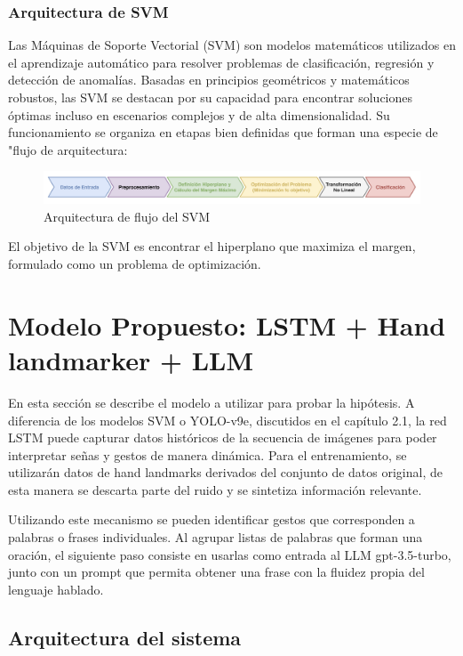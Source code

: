 \documentclass{article}
\begin{document}
\subsubsection{Arquitectura de SVM}

Las Máquinas de Soporte Vectorial (SVM) son modelos matemáticos utilizados en el aprendizaje automático para resolver problemas de clasificación, regresión y detección de anomalías. Basadas en principios geométricos y matemáticos robustos, las SVM se destacan por su capacidad para encontrar soluciones óptimas incluso en escenarios complejos y de alta dimensionalidad.  Su funcionamiento se organiza en etapas bien definidas que forman una especie de "flujo de arquitectura:

\begin{figure}[!hbtp]
    \centering
    \includegraphics[width=5in]{figuras/flujoSVM.png}
		\caption{Arquitectura de flujo del SVM}
		\label{fig6}
\end{figure}

El objetivo de la SVM es encontrar el hiperplano que maximiza el margen, formulado como un problema de optimización.


\section{Modelo Propuesto: LSTM + Hand landmarker + LLM}

En esta sección se describe el modelo a utilizar para probar la hipótesis. A diferencia de los modelos SVM o YOLO-v9e, discutidos en el capítulo 2.1, la red LSTM puede capturar datos históricos de la secuencia de imágenes para poder interpretar señas y gestos de manera dinámica. Para el entrenamiento, se utilizarán datos de hand landmarks derivados del conjunto de datos original, de esta manera se descarta parte del ruido y se sintetiza información relevante.

Utilizando este mecanismo se pueden identificar gestos que corresponden a palabras o frases individuales. Al agrupar listas de palabras que forman una oración, el siguiente paso consiste en usarlas como entrada al LLM gpt-3.5-turbo, junto con un prompt que permita obtener una frase con la fluidez propia del lenguaje hablado.

\subsection{Arquitectura del sistema}
\end{document}
